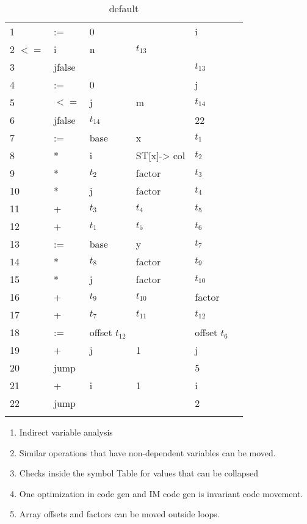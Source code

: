 \begin{table}[htdp]
\caption{default}
\begin{center}
\begin{tabular}{|l|l|l|l|l|l|}
1	&:=		&0	&	&	i \\
2	$<=$	&i		&n	& $t_{13}$ \\
3	&jfalse	&		& & $t_{13}$	\\

4	& :=		&0	&&		j \\
5	& $<=$		&j		&m	& $t_{14}$  \\
6	& jfalse	& $t_{14}$ 	&	&		22			\\
7	& 	:= 	&base 		&	x		& $t_1$ \\
8	&*		& 	i		& ST[x]-> col 	&	$t_2$ 	\\
9	&	*	& $t_2$		& factor 	& $t_3$	\\
10	&	*	& j			& factor 	& $t_4$	\\
11	& +		&$t_3$		& $t_4$	& $t_5$	\\
12	& +		&$t_1$		& $t_5$	& $t_6$	\\
13	& :=		& base		& y	& $t_7$	\\
14	&	*	& $t_8$		& factor 	& $t_9$	\\
15	&	*	& j			& factor 	& $t_{10}$	\\
16	&	+ 	& $t_9$		& $t_{10}$ 	& factor 	\\
17	&	+  	& $t_7$ 		& $t_{11}$ &	$t_{12}$ \\
18 	&  :=	&	offset $t_12 $ 	& 		& offset $t_{6}$  \\
19	&	+	&	j	&	1	&	j \\
20	&	jump	&		&		&    5 \\
21	&	+	&	i	&	1	&	i \\
22	&	jump	&		&		&    2 \\
\\\end{tabular}
\end{center}
\label{default}
\end{table}%


\begin{enumerate}
\item Indirect variable analysis
\item Similar operations that have non-dependent variables can be moved. 
\item Checks inside the symbol Table for values that can be collapsed
\item One optimization in  code gen and IM code gen is invariant code movement.
\item Array offsets and factors can be moved outside loops.  
\end{enumerate}



